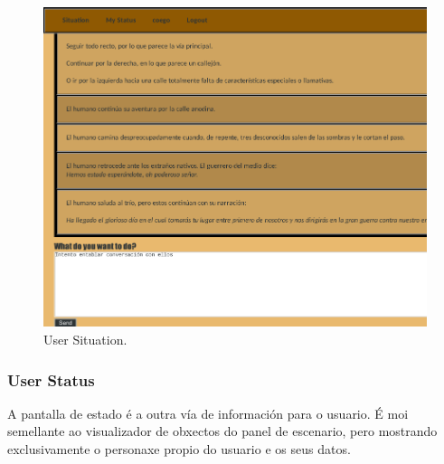 \begin{figure}
\centerline{\includegraphics{figuras/demiurgo_situation.png}}
\caption{User Situation.}
\label{fig:demiurgosituation}
\end{figure}

\subsubsection{User Status}
A pantalla de estado é a outra vía de información para o usuario. É moi
semellante ao visualizador de obxectos do panel de escenario, pero mostrando
exclusivamente o personaxe propio do usuario e os seus datos.
